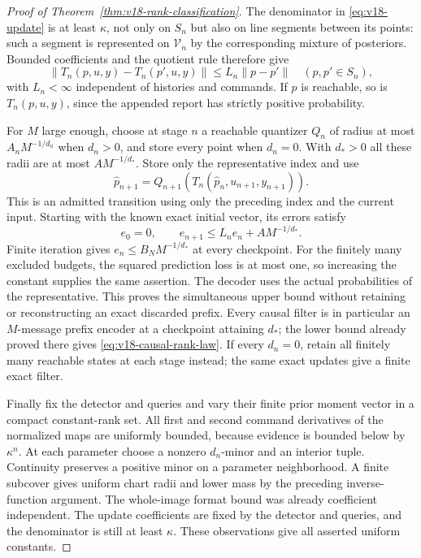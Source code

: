 \begin{proof}[Proof of Theorem~\ref{thm:v18-rank-classification}]
The denominator in \eqref{eq:v18-update} is at least $\kappa$, not only
on $S_n$ but also on line segments between its points: such a segment
is represented on $\mathscr V_n$ by the corresponding mixture of
posteriors. Bounded coefficients and the quotient rule therefore give
\[
 \|T_n(p,u,y)-T_n(p',u,y)\|\le L_n\|p-p'\|
 \quad(p,p'\in S_n),
\]
with $L_n<\infty$ independent of histories and commands. If $p$ is
reachable, so is $T_n(p,u,y)$, since the appended report has strictly
positive probability.

For $M$ large enough, choose at stage $n$ a reachable quantizer $Q_n$
of radius at most $A_nM^{-1/d_n}$ when $d_n>0$, and store every point
when $d_n=0$. With $d_* >0$ all these radii are at most
$AM^{-1/d_*}$. Store only the representative index and use
\[
 \widehat p_{n+1}=Q_{n+1}(T_n(\widehat p_n,u_{n+1},y_{n+1})).
\]
This is an admitted transition using only the preceding index and the
current input. Starting with the known exact initial vector, its errors
satisfy
\[
 e_0=0,\qquad e_{n+1}\le L_ne_n+AM^{-1/d_*}.
\]
Finite iteration gives $e_n\le B_NM^{-1/d_*}$ at every checkpoint.
For the finitely many excluded budgets, the squared prediction loss is
at most one, so increasing the constant supplies the same assertion.
The decoder uses the actual probabilities of the representative. This
proves the simultaneous upper bound without retaining or reconstructing
an exact discarded prefix. Every causal filter is in particular an
$M$-message prefix encoder at a checkpoint attaining $d_*$; the lower
bound already proved there gives \eqref{eq:v18-causal-rank-law}.
If every $d_n=0$, retain all finitely many reachable states at each
stage instead; the same exact updates give a finite exact filter.

Finally fix the detector and queries and vary their finite prior moment
vector in a compact constant-rank set. All first and second command
derivatives of the normalized maps are uniformly bounded, because
evidence is bounded below by $\kappa^n$. At each parameter choose a
nonzero $d_n$-minor and an interior tuple. Continuity preserves a
positive minor on a parameter neighborhood. A finite subcover gives
uniform chart radii and lower mass by the preceding inverse-function
argument. The whole-image format bound was already coefficient
independent. The update coefficients are fixed by the detector and
queries, and the denominator is still at least $\kappa$. These
observations give all asserted uniform constants.
\end{proof}

